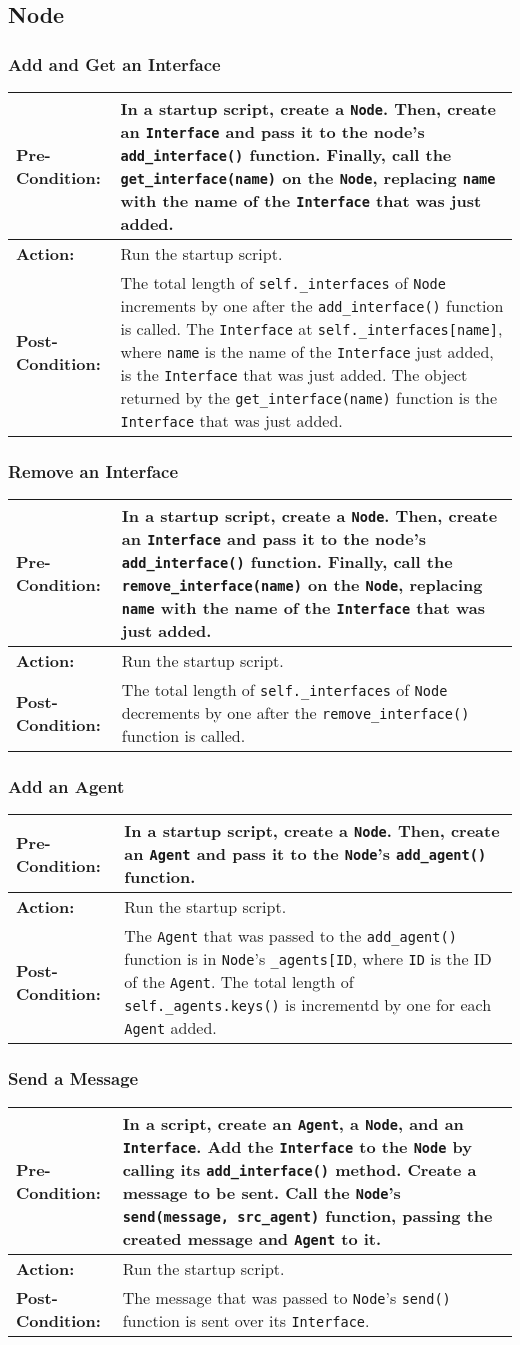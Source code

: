 \documentclass[titlepage]{article}
\newcommand{\testcase}[3]{
    \begin{center}
    \begin{tabular}{| l | p{0.7\textwidth}|}
        \hline
        \rowcolor[gray]{0.8}\textbf{Pre-Condition:} & #1 \\ \hline
        \textbf{Action:} & #2 \\ \hline
        \rowcolor[gray]{0.8}\textbf{Post-Condition:} & #3 \\ \hline
    \end{tabular}
    \end{center}
}
\begin{document}
\subsection{Node}
\subsubsection{Add and Get an Interface}
\testcase{In a startup script, create a \texttt{Node}. Then, create an \texttt{Interface} and pass it to the node's \texttt{add\_interface()} function. Finally, call the \texttt{get\_interface(name)} on the \texttt{Node}, replacing \texttt{name} with the name of the \texttt{Interface} that was just added.}{Run the startup script.}{The total length of \texttt{self.\_interfaces} of \texttt{Node} increments by one after the \texttt{add\_interface()} function is called. The \texttt{Interface} at \texttt{self.\_interfaces[name]}, where \texttt{name} is the name of the \texttt{Interface} just added, is the \texttt{Interface} that was just added.  The object returned by the \texttt{get\_interface(name)} function is the \texttt{Interface} that was just added.}

\subsubsection{Remove an Interface}
\testcase{In a startup script, create a \texttt{Node}. Then, create an \texttt{Interface} and pass it to the node's \texttt{add\_interface()} function. Finally, call the \texttt{remove\_interface(name)} on the \texttt{Node}, replacing \texttt{name} with the name of the \texttt{Interface} that was just added.}{Run the startup script.}{The total length of \texttt{self.\_interfaces} of \texttt{Node} decrements by one after the \texttt{remove\_interface()} function is called.}

\subsubsection{Add an Agent}
\testcase{In a startup script, create a \texttt{Node}.  Then, create an \texttt{Agent} and pass it to the \texttt{Node}'s \texttt{add\_agent()} function.}{Run the startup script.}{The \texttt{Agent} that was passed to the \texttt{add\_agent()} function is in \texttt{Node}'s \texttt{\_agents[ID}, where \texttt{ID} is the ID of the \texttt{Agent}. The total length of \texttt{self.\_agents.keys()} is incrementd by one for each \texttt{Agent} added.}

\subsubsection{Send a Message}
\testcase{In a script, create an \texttt{Agent}, a \texttt{Node}, and an \texttt{Interface}.  Add the \texttt{Interface} to the \texttt{Node} by calling its \texttt{add\_interface()} method. Create a message to be sent.  Call the \texttt{Node}'s \texttt{send(message, src\_agent)} function, passing the created message and \texttt{Agent} to it.}{Run the startup script.}{The message that was passed to \texttt{Node}'s \texttt{send()} function is sent over its \texttt{Interface}.}
\end{document}
